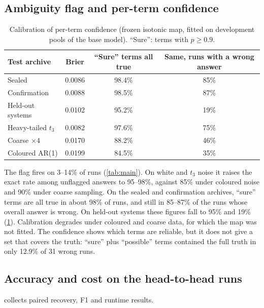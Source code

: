 \subsection{Ambiguity flag and per-term confidence}
\label{sec:confidence}

\begin{table}[t]
\centering
\caption{Calibration of per-term confidence (frozen isotonic map, fitted on development pools of the base model). ``Sure'': terms with $p\ge0.9$.}
\label{tab:conf}
\small
\begin{tabular}{@{}lccc@{}}
\toprule
Test archive & Brier & ``Sure'' terms all true & Same, runs with a wrong answer \\
\midrule
Sealed & 0.0086 & 98.4\% & 85\% \\
Confirmation & 0.0088 & 98.5\% & 87\% \\
Held-out systems & 0.0102 & 95.2\% & 19\% \\
Heavy-tailed $t_3$ & 0.0082 & 97.6\% & 75\% \\
Coarse $\times4$ & 0.0170 & 88.2\% & 46\% \\
Coloured AR(1) & 0.0199 & 84.5\% & 35\% \\
\bottomrule
\end{tabular}
\end{table}

The flag fires on 3--14\% of runs (\cref{tab:main}). On white and $t_3$ noise it raises the exact rate among unflagged answers to 95--98\%, against 85\% under coloured noise and 90\% under coarse sampling. On the sealed and confirmation archives, ``sure'' terms are all true in about 98\% of runs, and still in 85--87\% of the runs whose overall answer is wrong. On held-out systems these figures fall to 95\% and 19\% (\cref{tab:conf}). Calibration degrades under coloured and coarse data, for which the map was not fitted. The confidence shows which terms are reliable, but it does not give a set that covers the truth: ``sure'' plus ``possible'' terms contained the full truth in only 12.9\% of 31 wrong runs.

\subsection{Accuracy and cost on the head-to-head runs}
 collects paired recovery, F1 and runtime results.


